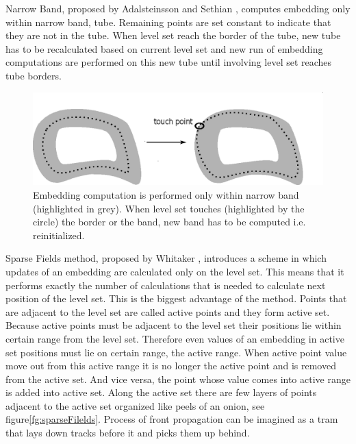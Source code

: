 Narrow Band, proposed by Adalsteinsson and Sethian \cite{sethianFastLS}, computes embedding only within narrow band, tube.
Remaining points are set constant to indicate that they are not in the tube.
When level set reach the border of the tube, new tube has to be recalculated based on current level set and new run of embedding computations are performed on this new tube until involving level set reaches tube borders.

\begin{figure}
    \centering
    \includegraphics[width=\textwidth]{data/narrowBands}
    \caption[Narrow band computation illustration]{Embedding computation is performed only within narrow band (highlighted in grey). When level set touches (highlighted by the circle) the border or the band, new band has to be computed i.e. reinitialized.}
    \label{fg:narrowBands}
\end{figure}

\par
Sparse Fields method, proposed by Whitaker \cite{sparseFilelds}, introduces a scheme in which updates of an embedding are calculated only on the level set.
This means that it performs exactly the number of calculations that is needed to calculate next position of the level set.
This is the biggest advantage of the method. Points that are adjacent to the level set are called active points and they form active set.
Because active points must be adjacent to the level set their positions lie within certain range from the level set.
Therefore even values of an embedding in active set positions must lie on certain range, the active range.
When active point value move out from this active range it is no longer the active point and is removed from the active set.
And vice versa, the point whose value comes into active range is added into active set.
Along the active set there are few layers of points adjacent to the active set organized like peels of an onion, see figure\ref{fg:sparseFilelds}.
Process of front propagation can be imagined as a tram that lays down tracks before it and picks them up behind.

